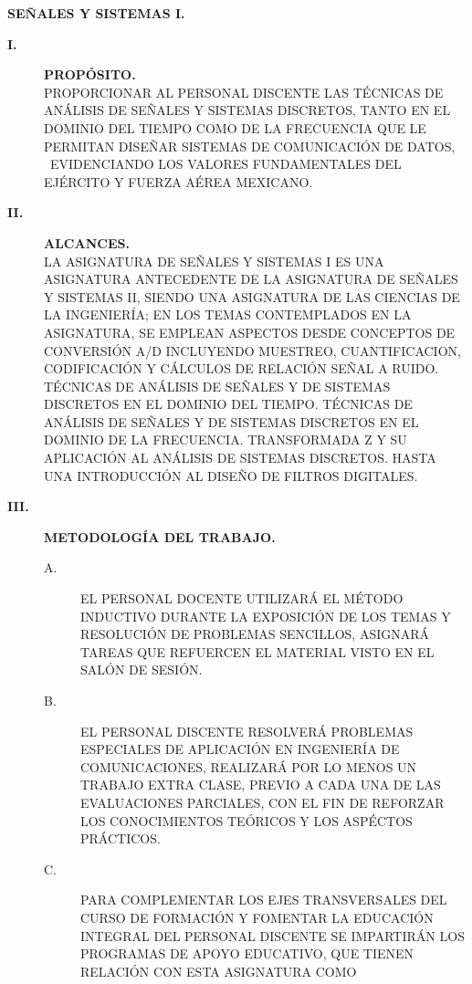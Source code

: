 \documentclass{myarticle}
\begin{document}
\begin{center}{\huge{\bf SEÑALES Y SISTEMAS I.}}\end{center}

\begin{description}
\item[{\large{\bf I.}}]{\large{\bf PROPÓSITO.}}\\
PROPORCIONAR AL PERSONAL DISCENTE LAS TÉCNICAS DE ANÁLISIS DE SEÑALES Y 
SISTEMAS DISCRETOS, TANTO EN EL DOMINIO DEL TIEMPO COMO DE LA FRECUENCIA 
QUE LE PERMITAN DISEÑAR SISTEMAS DE COMUNICACIÓN DE DATOS,  \ EVI\-DEN\-CIAN\-DO 
LOS VALORES FUNDAMENTALES DEL EJÉRCITO Y FUERZA AÉREA MEXICANO.
\item[{\large{\bf II.}}]{\large{\bf ALCANCES.}}\\
LA ASIGNATURA DE SEÑALES Y SISTEMAS I ES UNA ASIGNATURA ANTECEDENTE DE 
LA ASIGNATURA DE SEÑALES Y SIS\-TE\-MAS II, SIENDO UNA ASIGNATURA DE LAS 
CIENCIAS DE LA INGENIERÍA; EN LOS TEMAS CONTEMPLADOS EN LA ASIGNATURA, 
SE EMPLEAN ASPECTOS DESDE CONCEPTOS DE CONVERSIÓN A/D INCLUYENDO MUESTREO, 
CUANTIFICACION, CODIFICACIÓN Y CÁLCULOS DE RELACIÓN SEÑAL A RUIDO. 
TÉCNICAS DE ANÁLISIS DE SEÑALES Y DE SISTEMAS DISCRETOS EN EL DOMINIO DEL 
TIEMPO. TÉCNICAS DE ANÁLISIS DE SEÑALES Y DE SISTEMAS DISCRETOS EN EL 
DOMINIO DE LA FRECUENCIA. TRANSFORMADA Z Y SU APLICACIÓN AL ANÁLISIS DE 
SISTEMAS DISCRETOS. HASTA UNA INTRODUCCIÓN AL DISEÑO DE FILTROS DIGITALES.
\item[{\large{\bf III.}}]{\large{\bf  METODOLOGÍA DEL TRABAJO.}}\\
\begin{description}
\item[A.]EL PERSONAL DOCENTE UTILIZARÁ EL MÉTODO INDUCTIVO DURANTE LA 
EXPOSICIÓN DE LOS TEMAS Y RESOLUCIÓN DE PROBLEMAS SENCILLOS, ASIGNARÁ 
TAREAS QUE REFUERCEN EL MATERIAL VISTO EN EL SALÓN DE SESIÓN.
\item[B.]EL PERSONAL DISCENTE RESOLVERÁ PROBLEMAS ES\-PE\-CIA\-LES DE 
APLICACIÓN EN INGENIERÍA DE COMUNICACIONES, REALIZARÁ POR LO MENOS UN 
TRABAJO EXTRA CLASE, PREVIO A CADA UNA DE LAS EVALUACIONES PARCIALES, CON 
EL FIN DE REFORZAR LOS CONOCIMIENTOS TEÓRICOS Y LOS ASPÉCTOS PRÁCTICOS.
\item[C.]PARA COMPLEMENTAR LOS EJES TRANSVERSALES DEL CUR\-SO DE FORMACIÓN 
Y FOMENTAR LA EDUCACIÓN INTEGRAL DEL PERSONAL DISCENTE SE IMPARTIRÁN LOS 
PROGRAMAS DE APOYO EDUCATIVO, QUE TIENEN RELACIÓN CON ESTA ASIGNATURA COMO 

\end{description}
\end{description}
\end{document}

